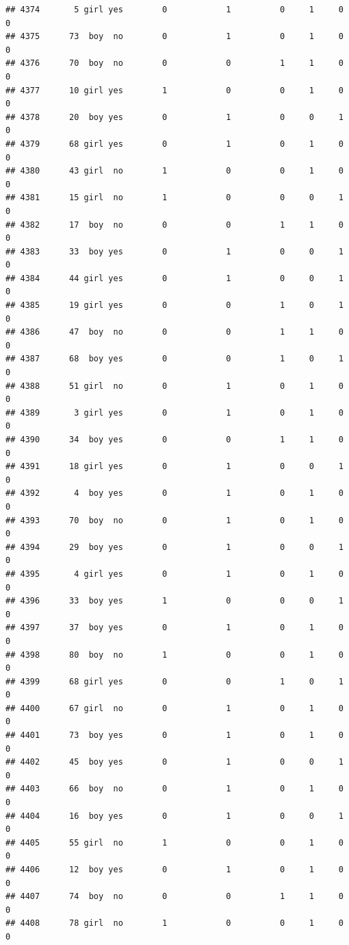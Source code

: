 \documentclass[man]{apa6}
\begin{document}
\begin{verbatim}
## 4374       5 girl yes        0            1          0     1     0     0
## 4375      73  boy  no        0            1          0     1     0     0
## 4376      70  boy  no        0            0          1     1     0     0
## 4377      10 girl yes        1            0          0     1     0     0
## 4378      20  boy yes        0            1          0     0     1     0
## 4379      68 girl yes        0            1          0     1     0     0
## 4380      43 girl  no        1            0          0     1     0     0
## 4381      15 girl  no        1            0          0     0     1     0
## 4382      17  boy  no        0            0          1     1     0     0
## 4383      33  boy yes        0            1          0     0     1     0
## 4384      44 girl yes        0            1          0     0     1     0
## 4385      19 girl yes        0            0          1     0     1     0
## 4386      47  boy  no        0            0          1     1     0     0
## 4387      68  boy yes        0            0          1     0     1     0
## 4388      51 girl  no        0            1          0     1     0     0
## 4389       3 girl yes        0            1          0     1     0     0
## 4390      34  boy yes        0            0          1     1     0     0
## 4391      18 girl yes        0            1          0     0     1     0
## 4392       4  boy yes        0            1          0     1     0     0
## 4393      70  boy  no        0            1          0     1     0     0
## 4394      29  boy yes        0            1          0     0     1     0
## 4395       4 girl yes        0            1          0     1     0     0
## 4396      33  boy yes        1            0          0     0     1     0
## 4397      37  boy yes        0            1          0     1     0     0
## 4398      80  boy  no        1            0          0     1     0     0
## 4399      68 girl yes        0            0          1     0     1     0
## 4400      67 girl  no        0            1          0     1     0     0
## 4401      73  boy yes        0            1          0     1     0     0
## 4402      45  boy yes        0            1          0     0     1     0
## 4403      66  boy  no        0            1          0     1     0     0
## 4404      16  boy yes        0            1          0     0     1     0
## 4405      55 girl  no        1            0          0     1     0     0
## 4406      12  boy yes        0            1          0     1     0     0
## 4407      74  boy  no        0            0          1     1     0     0
## 4408      78 girl  no        1            0          0     1     0     0

\end{verbatim}
\end{document}
